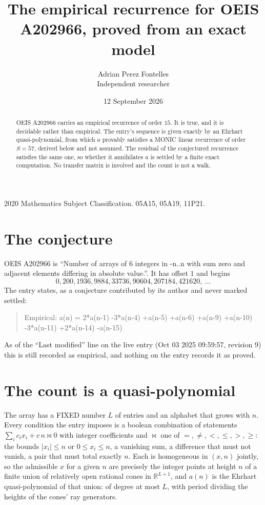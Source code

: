 \documentclass[11pt,a4paper]{article}
\title{The empirical recurrence for OEIS A202966, proved from an exact model}
\author{Adrian Perez Fontelles\\ \small Independent researcher}
\date{12 September 2026}
\theoremstyle{plain}
\theoremstyle{definition}
\begin{document}
\maketitle

\begin{abstract}
OEIS A202966 carries an empirical recurrence of order $15$. It is true, and it is
decidable rather than empirical. The entry's sequence is given exactly by an Ehrhart quasi-polynomial, from
which $a$ provably satisfies a MONIC linear recurrence of order $S=57$, derived below and not
assumed. The residual of the conjectured recurrence satisfies the same one, so whether it
annihilates $a$ is settled by a finite exact computation. No transfer matrix is involved and
the count is not a walk.
\end{abstract}

\noindent\small 2020 Mathematics Subject Classification. 05A15, 05A19, 11P21.\normalsize

\section{The conjecture}

OEIS A202966 is ``Number of arrays of 6 integers in -n..n with sum zero and adjacent elements differing in absolute value.''. It has offset $1$ and begins
\[
0, 200, 1936, 9884, 33736, 90604, 207184, 421620,\ \dots
\]
The entry states, as a conjecture contributed by its author and never marked settled:
\begin{quote}
Empirical: a(n) = 2*a(n-1) -3*a(n-4) +a(n-5) +a(n-6) +a(n-9) +a(n-10) -3*a(n-11) +2*a(n-14) -a(n-15)
\end{quote}
As of the ``Last modified'' line on the live entry (Oct 03 2025 09:59:57, revision 9)
this is still recorded as empirical, and nothing on the entry records it as proved.

\section{The count is a quasi-polynomial}

The array has a FIXED number $L$ of entries and an alphabet that grows with $n$. Every
condition the entry imposes is a boolean combination of statements
$\sum_i c_ix_i + c\,n \bowtie 0$ with integer coefficients and $\bowtie$ one of
$=,\ne,<,\le,>,\ge$: the bounds $|x_i|\le n$ or $0\le x_i\le n$, a vanishing sum, a difference
that must not vanish, a pair that must total exactly $n$. Each is homogeneous in $(x,n)$
jointly, so the admissible $x$ for a given $n$ are precisely the integer points at height $n$
of a finite union of relatively open rational cones in $\mathbb{R}^{L+1}$, and $a(n)$ is
the Ehrhart quasi-polynomial of that union: of degree at most $L$, with period dividing the
heights of the cones' ray generators.
\end{document}
